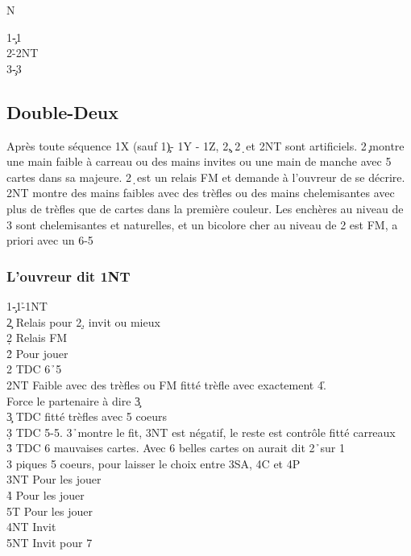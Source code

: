 \documentclass[a4paper]{article}
\begin{document}
\dealdiagramenw
{}
{}
{}
{N}

\begin{bidtable}
1\c-1\s\\
2\h-2NT\\
3\c-3\s
\end{bidtable}

\subsection{Double-Deux}

Après toute séquence 1X (sauf 1\c )- 1Y - 1Z, 2\c , 2\d\ et 2NT sont artificiels. 2\c\ montre
une main faible à carreau ou des mains invites ou une main de manche avec 5 cartes
dans sa majeure. 2\d\ est un relais FM et demande à l'ouvreur de se décrire.
2NT montre des mains faibles avec des trèfles ou des mains chelemisantes avec plus de
trèfles que de cartes dans la première couleur.
Les enchères au niveau de 3 sont chelemisantes et naturelles, et un bicolore cher
au niveau de 2 est FM, a priori avec un 6-5

\subsubsection{L'ouvreur dit 1NT}

\begin{bidtable}
1\c-1\h-1NT\+\\
2\c \> Relais pour 2\d , invit ou mieux\\
2\d \> Relais FM\\
2\h \> Pour jouer\\
2\s \> TDC 6\h\ 5\s \\
2NT \> Faible avec des trèfles ou FM fitté trèfle avec exactement 4\h .\+\\
Force \> le partenaire à dire 3\c \-\\
3\c \> TDC fitté trèfles avec 5 coeurs\\
3\d \> TDC 5-5. 3\h\ montre le fit, 3NT est négatif, le reste est contrôle fitté carreaux\\
3\h \> TDC 6 mauvaises cartes. Avec 6 belles cartes on aurait dit 2\h\ sur 1\c \\
3\s {} piques 5 coeurs, pour laisser le choix entre 3SA, 4C et 4P\\
3NT \> Pour les jouer\\
4\h \> Pour les jouer\\
5T \> Pour les jouer\\
4NT \> Invit\\
5NT \> Invit pour 7\-
\end{bidtable}
\end{document}
